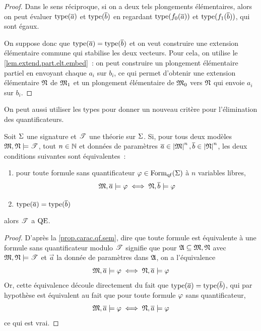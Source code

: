 \begin{proof}
  Dans le sens réciproque, si on a deux tels plongements élémentaires, alors on
  peut évaluer $\operatorname{type}(\overline{a})$ et $\operatorname{type}(\overline{b})$ en regardant
  $\operatorname{type}(f_0(\overline{a}))$ et $\operatorname{type}(f_1(\overline{b}))$, qui sont égaux.

  On suppose donc que $\operatorname{type}(\overline{a}) = \operatorname{type}(\overline{b})$ et on veut construire une
  extension élémentaire commune qui stabilise les deux vecteurs. Pour cela, on
  utilise le \cref{lem.extend.part.elt.embed}~: on peut construire un
  plongement élémentaire partiel en envoyant chaque $a_i$ sur $b_i$, ce
  qui permet d'obtenir une extension élémentaire $\mathfrak{N}$ de $\mathfrak{M}_1$ et un
  plongement élémentaire de $\mathfrak{M}_0$ vers $\mathfrak{N}$ qui envoie $a_i$ sur
  $b_i$.
\end{proof}

On peut aussi utiliser les types pour donner un nouveau critère pour
l'élimination des quantificateurs.

\begin{proposition}
  Soit $\Sigma$ une signature et $\mathscr T$ une théorie sur $\Sigma$. Si, pour tous
  deux modèles $\mathfrak{M},\mathfrak{N}\models\mathscr T$, tout $n \in \mathbb N$ et données de
  paramètres $\overline{a} \in\left\vert \mathfrak{M}\right\vert^n,\overline{b} \in \left\vert \mathfrak{N}\right\vert^n$, les deux conditions
  suivantes sont équivalentes~:
  \begin{enumerate}[label=(\roman*)]
  \item pour toute formule sans quantificateur $\varphi\in\operatorname{Form}_{\mathrm{qf}}(\Sigma)$ à
    $n$ variables libres,
    \[\mathfrak{M},\overline{a} \models\varphi\iff\mathfrak{N},\overline{b}\models\varphi\]
  \item $\operatorname{type}(\overline{a}) = \operatorname{type}(\overline{b})$
  \end{enumerate}
  alors $\mathscr T$ a $\operatorname{QE}$.
\end{proposition}

\begin{proof}
  D'après la \cref{prop.carac.qf.sem}, dire que toute formule est équivalente
  à une formule sans quantificateur modulo $\mathscr T$ signifie que pour
  $\mathfrak{A}\subseteq\mathfrak{M},\mathfrak{N}$ avec $\mathfrak{M},\mathfrak{N}\models\mathscr T$ et
  $\vec a$ la donnée de paramètres dans $\mathfrak{A}$, on a l'équivalence
  \[\mathfrak{M},\overline{a} \models\varphi\iff\mathfrak{N},\overline{a}\models\varphi\]
  Or, cette équivalence découle directement du fait que
  $\operatorname{type}(\overline{a}) = \operatorname{type}(\overline{b})$, qui par hypothèse est équivalent au fait
  que pour toute formule $\varphi$ sans quantificateur,
  \[\mathfrak{M},\overline{a} \models\varphi\iff\mathfrak{N},\overline{a} \models\varphi\]
  ce qui est vrai.
\end{proof}

